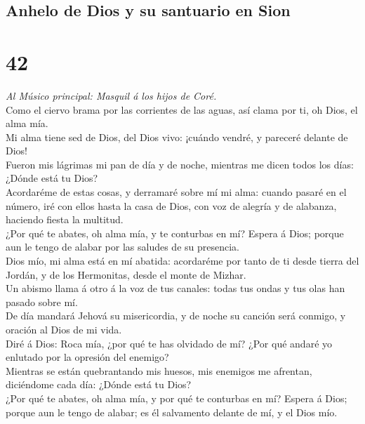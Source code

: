 \hypertarget{anhelo-de-dios-y-su-santuario-en-sion}{%
\subsection{Anhelo de Dios y su santuario en
Sion}\label{anhelo-de-dios-y-su-santuario-en-sion}}

\hypertarget{section-41}{%
\section{42}\label{section-41}}

 \emph{Al Músico principal: Masquil á los hijos de Coré.}\\
Como el ciervo brama por las corrientes de las aguas, así clama por ti,
oh Dios, el alma mía.\\
 Mi alma tiene sed de Dios, del Dios vivo: ¡cuándo vendré, y
pareceré delante de Dios!\\
 Fueron mis lágrimas mi pan de día y de noche, mientras me
dicen todos los días: ¿Dónde está tu Dios?\\
 Acordaréme de estas cosas, y derramaré sobre mí mi alma:
cuando pasaré en el número, iré con ellos hasta la casa de Dios, con voz
de alegría y de alabanza, haciendo fiesta la multitud.\\
 ¿Por qué te abates, oh alma mía, y te conturbas en mí?
Espera á Dios; porque aun le tengo de alabar por las saludes de su
presencia.\\
 Dios mío, mi alma está en mí abatida: acordaréme por tanto
de ti desde tierra del Jordán, y de los Hermonitas, desde el monte de
Mizhar.\\
 Un abismo llama á otro á la voz de tus canales: todas tus
ondas y tus olas han pasado sobre mí.\\
 De día mandará Jehová su misericordia, y de noche su
canción será conmigo, y oración al Dios de mi vida.\\
 Diré á Dios: Roca mía, ¿por qué te has olvidado de mí? ¿Por
qué andaré yo enlutado por la opresión del enemigo?\\
 Mientras se están quebrantando mis huesos, mis enemigos me
afrentan, diciéndome cada día: ¿Dónde está tu Dios?\\
 ¿Por qué te abates, oh alma mía, y por qué te conturbas en
mí? Espera á Dios; porque aun le tengo de alabar; es él salvamento
delante de mí, y el Dios mío.


